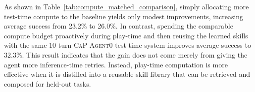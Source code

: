 \begin{table}[htbp]
    \centering
    \caption{\textbf{Compute-matched performance comparison on LIBERO-PRO.} The
    \textsc{CaP-Agent0} (15 turns) baseline is granted additional retry budget at test time to match
    the amortized token cost that \textsc{RATs} spent during play-time. The \textsc{CaP-Agent0} +
    \textsc{RATs} Skills row uses the standard 10-turn \textsc{CaP-Agent0} test-time system, with
    skills learned from 50 iterations of Curious Play.}
    \label{tab:compute_matched_comparison}
\end{table}

As shown in Table~\ref{tab:compute_matched_comparison}, simply allocating more test-time compute
to the baseline yields only modest improvements, increasing average success from 23.2\% to 26.0\%.
In contrast, spending the comparable compute budget proactively during play-time and then reusing
the learned skills with the same 10-turn \textsc{CaP-Agent0} test-time system improves average
success to 32.3\%. This result indicates that the gain does not come merely from giving the agent
more inference-time retries. Instead, play-time computation is more effective when it is distilled into
a reusable skill library that can be retrieved and composed for held-out tasks.
